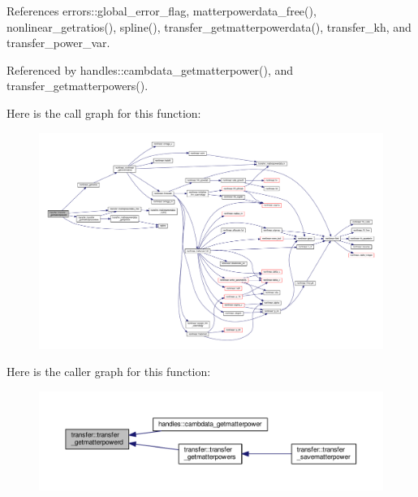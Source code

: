 References errors\+::global\+\_\+error\+\_\+flag, matterpowerdata\+\_\+free(), nonlinear\+\_\+getratios(), spline(), transfer\+\_\+getmatterpowerdata(), transfer\+\_\+kh, and transfer\+\_\+power\+\_\+var.



Referenced by handles\+::cambdata\+\_\+getmatterpower(), and transfer\+\_\+getmatterpowers().

Here is the call graph for this function\+:
\nopagebreak
\begin{figure}[H]
\begin{center}
\leavevmode
\includegraphics[width=350pt]{namespacetransfer_aec77f610696b7445e8c8e070491ca238_cgraph}
\end{center}
\end{figure}
Here is the caller graph for this function\+:
\nopagebreak
\begin{figure}[H]
\begin{center}
\leavevmode
\includegraphics[width=350pt]{namespacetransfer_aec77f610696b7445e8c8e070491ca238_icgraph}
\end{center}
\end{figure}
\mbox{\label{namespacetransfer_a149c7870c28cd849591073c3d8f76d69}} 
